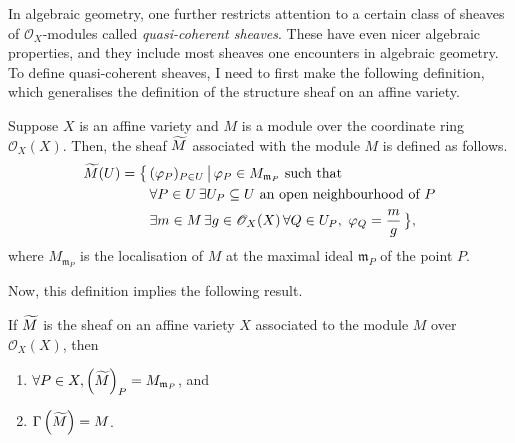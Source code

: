 In algebraic geometry, one further restricts attention to a certain class of
sheaves of $\mathscr{O}_{X}$-modules called \emph{quasi-coherent sheaves}.
These have even nicer algebraic properties, and they include most sheaves
one encounters in algebraic geometry. To define quasi-coherent sheaves,
I need to first make the following definition, which generalises the
definition of the structure sheaf on an affine variety.
\begin{defin}
  Suppose $X$ is an affine variety and $M$ is a module over the coordinate
  ring $\mathscr{O}_{X}(X)$. Then, the sheaf $\widetilde{M}$ associated with the
  module $M$ is defined as follows.
  \begin{align*}
    \widetilde{M}(U)=\big\{\,
    & (\varphi_{P})_{P\in U}\,\big\vert\, \varphi_{P}\in M_{\mathfrak{m}_{P}}
      \text{ such that} \\
    & \forall P\in U\,
      \exists U_{P}\subseteq U\text{ an open neighbourhood of }P \\
    & \exists m\in M\,\exists g\in \mathscr{O}_{X}(X)\,
    \forall Q\in U_{P},\ \varphi_{Q}=\frac{m}g\,\big\},
  \end{align*}
  where $M_{\mathfrak{m}_{P}}$ is the localisation of $M$ at the maximal ideal
  $\mathfrak{m}_{P}$ of the point $P$.
\end{defin}
Now, this definition implies the following result.
\begin{lemm}\label{lemm:qcoh_local_global}
  If $\widetilde{M}$ is the sheaf on an affine variety $X$ associated to the module
  $M$ over $\mathscr{O}_{X}(X)$, then
  \begin{enumerate}[label=\normalfont(\alph*)]
    \item $\forall P\in X, \left(\widetilde{M}\right)_{P}=M_{\mathfrak{m}_{P}}$, and
    \item $\Gamma\left(\widetilde{M}\right)=M$.
  \end{enumerate}
\end{lemm}
